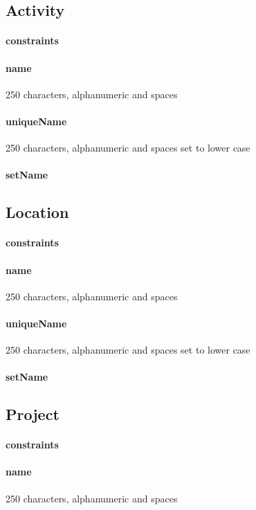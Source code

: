 \documentclass[12pt]{article}
\begin{document}
\subsection{Activity}\label{sec:DActivity}
\paragraph{constraints}
\paragraph{name} 250 characters, alphanumeric and spaces 
\paragraph{uniqueName} 250 characters, alphanumeric and spaces  set to lower case
\paragraph{setName}

\setcounter{paragraph}{0}
\subsection{Location}\label{sec:DLocation}
\paragraph{constraints}
\paragraph{name} 250 characters, alphanumeric and spaces 
\paragraph{uniqueName} 250 characters, alphanumeric and spaces  set to lower case
\paragraph{setName}

\setcounter{paragraph}{0}
\subsection{Project}\label{sec:DProject}
\paragraph{constraints}
\paragraph{name} 250 characters, alphanumeric and spaces 
\end{document}
